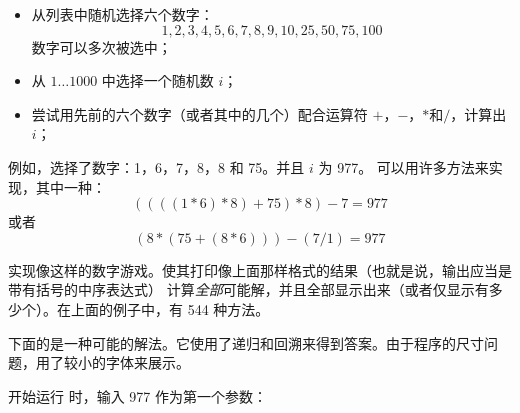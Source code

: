 \begin{Exercise}[title={数字游戏},difficulty=9]
\label{ex:numbercruncher}
\begin{itemize}
\item{从列表中随机选择六个数字：
$$1, 2, 3, 4, 5, 6, 7, 8, 9, 10, 25, 50, 75, 100$$
数字可以多次被选中；}
\item{从 $1 \ldots 1000$ 中选择一个随机数 $i$；}
\item{尝试用先前的六个数字（或者其中的几个）配合运算符 $+$，$-$，$*$和$/$，计算出 $i$；}
\end{itemize}
例如，选择了数字：1，6，7，8，8 和 75。并且 $i$ 为 977。
可以用许多方法来实现，其中一种：
$$ ((((1 * 6) * 8) + 75) * 8) - 7 = 977$$ 
或者
$$ (8*(75+(8*6)))-(7/1) = 977$$

\Question\label{ex:cruncher q1}
实现像这样的数字游戏。使其打印像上面那样格式的结果（也就是说，输出应当是带有括号的中序表达式）
\Question\label{ex:cruncher q2}
计算\emph{全部}可能解，并且全部显示出来（或者仅显示有多少个）。在上面的例子中，有 544 种方法。
\end{Exercise}

\begin{Answer}
\Question 
下面的是一种可能的解法。它使用了递归和回溯来得到答案。由于程序的尺寸问题，用了较小的字体来展示。


\Question
开始运行  时，输入 977 作为第一个参数：
\vspace{1em}

\end{Answer}
